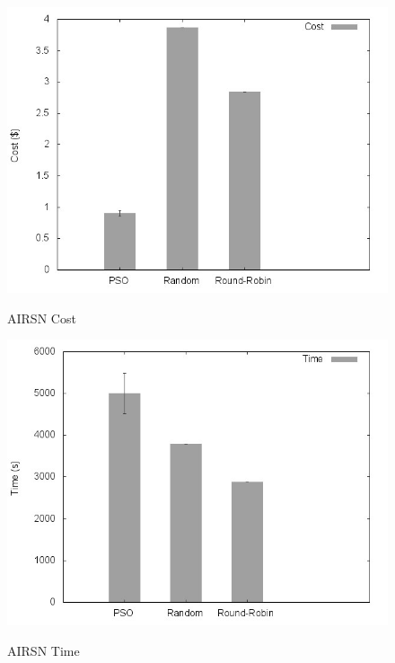 \documentclass[a4paper,10pt]{article}
\begin{document}
\begin{figure}[!htb]
\centering

\includegraphics[scale=.55]{graphs/airns_cost.jpeg}
\label{airsn_cost}
\caption{AIRSN Cost}

\includegraphics[scale=.55]{graphs/airns_time.jpeg}
\label{airsn_time}
\caption{AIRSN Time}

\end{figure}
\end{document}
